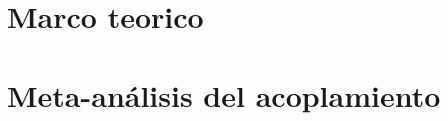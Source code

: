 \documentclass[letterpaper,12pt]{book}
\begin{document}
\frontmatter
    
    \tableofcontents
    

\mainmatter
    \chapter{Marco teorico}
        
        
        
        
    \chapter{Meta-análisis del acoplamiento}
        




\backmatter
    \nocite{*}
    \printbibliography
\end{document}
